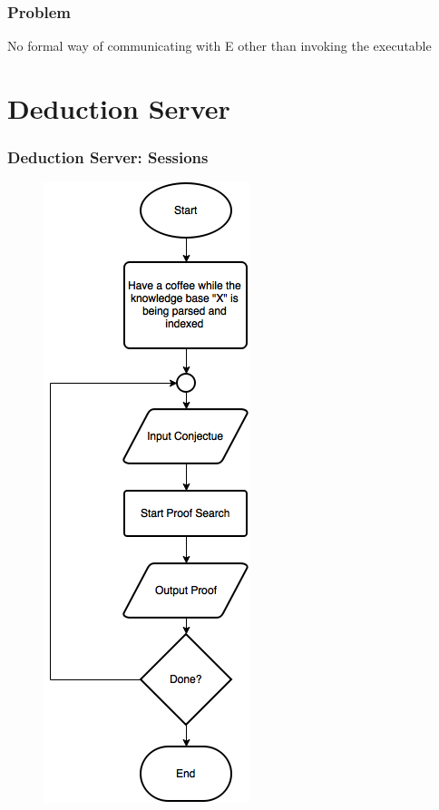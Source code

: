 \documentclass[10pt]{beamer}
\begin{document}
\begin{frame}[fragile]
  \frametitle{Problem}
  No formal way of communicating with E other than invoking the executable
\end{frame}

\section{Deduction Server}
\begin{frame}[fragile]
  \frametitle{Deduction Server: Sessions}
  \begin{figure} \includegraphics[width=\linewidth,height=0.9\textheight,keepaspectratio]{imgs/NewDeductionFC.png} \end{figure}

\end{frame}
\end{document}
